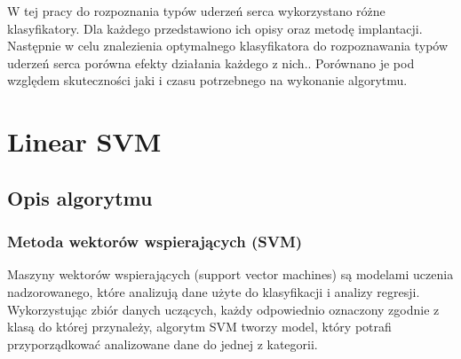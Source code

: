 \documentclass[[10pt,a4paper]{article}
\begin{document}
 	W tej pracy do rozpoznania typów uderzeń serca wykorzystano różne klasyfikatory. Dla każdego przedstawiono ich opisy oraz metodę implantacji. Następnie w celu znalezienia optymalnego klasyfikatora do rozpoznawania typów uderzeń serca porówna efekty działania każdego z nich.. Porównano je pod względem skuteczności jaki i czasu potrzebnego na wykonanie algorytmu. 
 	\newpage

\section{Linear SVM}
\subsection{Opis algorytmu}
\vspace{5mm}
\subsubsection{Metoda wektorów wspierających (SVM)}
\vspace{5mm}


Maszyny wektorów wspierających (support vector machines) są modelami uczenia nadzorowanego, które analizują dane użyte do klasyfikacji i analizy regresji.
 Wykorzystując zbiór danych uczących, każdy odpowiednio oznaczony zgodnie z klasą do której przynależy, algorytm SVM tworzy model, który potrafi
przyporządkować analizowane dane do jednej z kategorii. 
\vspace{5mm}
\end{document}
